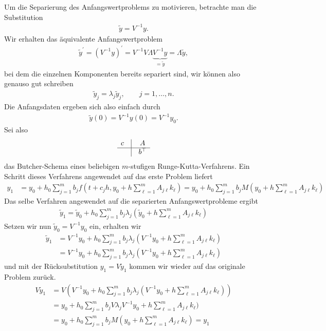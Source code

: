 \begin{solution}
Um die Separierung des Anfangswertproblems zu motivieren, betrachte man die Substitution
\begin{align*}
  \widetilde{y} = V^{-1}y.
\end{align*}
 Wir erhalten das äquivalente Anfangswertproblem
\begin{align*}
  \widetilde{y}^{\prime} = (V^{-1}y)^{\prime} = V^{-1}V\Lambda\underbrace{V^{-1}y}_{ = \widetilde{y}} = \Lambda\widetilde{y},
\end{align*}
bei dem die einzelnen Komponenten bereits separiert sind, wir können also genauso gut schreiben
\begin{align*}
  \widetilde{y}_j = \lambda_j\widetilde{y}_j, \qquad j = 1,\dots,n.
\end{align*}
Die Anfangsdaten ergeben sich also einfach durch
\begin{align*}
   \widetilde{y}(0) = V^{-1}y(0) = V^{-1}y_0.
\end{align*}
Sei also
\renewcommand{\arraystretch}{1.5}
\begin{align*}
  \begin{matrix}
    c & \vline & A \\
    \hline
    & \vline & b^{\top}
  \end{matrix}
\end{align*}
das Butcher-Schema eines beliebigen $m$-stufigen Runge-Kutta-Verfahrens.
Ein Schritt dieses Verfahrens angewendet auf das erste Problem liefert
\begin{align*}
  y_1 &= y_0 + h_0 \sum_{j=1}^m b_jf(t + c_jh, y_0 + h\sum_{\ell = 1}^m A_{j\ell}k_{\ell})
  = y_0 + h_0 \sum_{j=1}^m b_jM(y_0 + h\sum_{\ell = 1}^m A_{j\ell}k_{\ell})
\end{align*}
Das selbe Verfahren angewendet auf die separierten Anfangswertprobleme ergibt
\begin{align*}
  \widetilde{y}_{1} = \widetilde{y}_{0} + h_0 \sum_{j=1}^m b_j\lambda_j(\widetilde{y}_{0} + h\sum_{\ell = 1}^m A_{j\ell}k_{\ell})
\end{align*}
Setzen wir nun $\widetilde{y}_{0} = V^{-1}y_0$ ein, erhalten wir
\begin{align*}
  \widetilde{y}_{1} &= V^{-1}y_0 + h_0 \sum_{j=1}^m b_j\lambda_j(V^{-1}y_0 + h\sum_{\ell = 1}^m A_{j\ell}k_{\ell}) \\
  &= V^{-1}y_0 + h_0 \sum_{j=1}^m b_j\lambda_j(V^{-1}y_0 + h\sum_{\ell = 1}^m A_{j\ell}k_{\ell})
\end{align*}
und mit der Rücksubstitution $y_1 = V\widetilde{y}_{1}$ kommen wir wieder auf
das originale Problem zurück.
\begin{align*}
  V\widetilde{y}_{1} &= V\left(V^{-1}y_0 + h_0 \sum_{j=1}^m b_j\lambda_j(V^{-1}y_0 + h\sum_{\ell = 1}^m A_{j\ell}k_{\ell})\right) \\
  &= y_0 + h_0 \sum_{j=1}^m b_jV\lambda_jV^{-1}y_0 + h\sum_{\ell = 1}^m A_{j\ell}k_{\ell}) \\
  &= y_0 + h_0 \sum_{j=1}^m b_jM(y_0 + h\sum_{\ell = 1}^m A_{j\ell}k_{\ell}) = y_1
\end{align*}
\end{solution}
